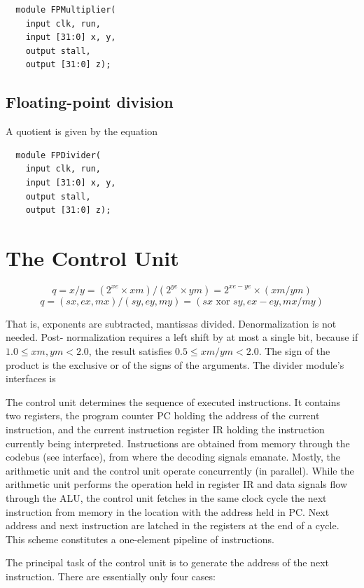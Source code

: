 \begin{verbatim}
  module FPMultiplier(
    input clk, run,
    input [31:0] x, y,
    output stall,
    output [31:0] z);
\end{verbatim}

\subsection{Floating-point division}
A quotient is given by the equation

\begin{verbatim}
  module FPDivider(
    input clk, run,
    input [31:0] x, y,
    output stall,
    output [31:0] z);
\end{verbatim}

\section{The Control Unit}
\[ q = x / y = (2^{xe} × xm) / (2^{ye} × ym) = 2^{xe-ye} × (xm / ym) \]
\[ q = (sx, ex, mx) / (sy, ey, my) = (sx\text{ xor }sy, ex - ey, mx / my) \]

That is, exponents are subtracted, mantissas divided. Denormalization is not needed. Post-
normalization requires a left shift by at most a single bit, because if $1.0 \le xm, ym < 2.0$, the result
satisfies $0.5 \le xm/ym < 2.0$. The sign of the product is the exclusive or of the signs of the
arguments. The divider module's interfaces is

The control unit determines the sequence of executed instructions. It contains two registers, the
program counter PC holding the address of the current instruction, and the current instruction
register IR holding the instruction currently being interpreted. Instructions are obtained from
memory through the codebus (see interface), from where the decoding signals emanate. Mostly,
the arithmetic unit and the control unit operate concurrently (in parallel). While the arithmetic unit
performs the operation held in register IR and data signals flow through the ALU, the control unit
fetches in the same clock cycle the next instruction from memory in the location with the address
held in PC. Next address and next instruction are latched in the registers at the end of a cycle.
This scheme constitutes a one-element pipeline of instructions.

The principal task of the control unit is to generate the address of the next instruction. There are
essentially only four cases:

